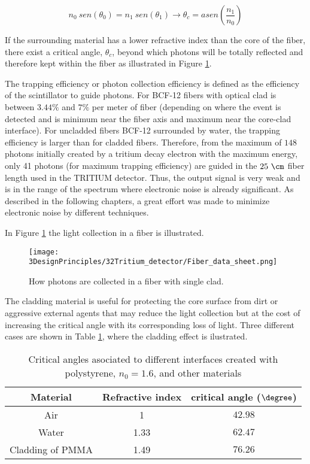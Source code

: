 \begin{equation}
n_0~sen(\theta_0) = n_1~sen(\theta_1) \longrightarrow \theta_c = asen\left(\frac{n_1}{n_0} \right)
\label{eq:Snell}
\end{equation}

If the surrounding material has a lower refractive index than the core of the fiber, there exist a critical angle, $\theta_c$, beyond which photons will be totally reflected and therefore kept within the fiber as illustrated in Figure \ref{fig:Fiber_physic}.

The trapping efficiency or photon collection efficiency is defined as the efficiency of the scintillator to guide photons. For BCF-12 fibers with optical clad is between $3.44\%$ and $7\%$ per meter of fiber (depending on where the event is detected and is minimum near the fiber axis  and maximum near the core-clad interface). For uncladded fibers BCF-12 surrounded by water, the trapping efficiency is larger than for cladded fibers. Therefore, from the maximum of $148$ photons initially created by a tritium decay electron with the maximum energy, only 41 photons (for maximum trapping efficiency) are guided in the $25~\cm$ fiber length used in the TRITIUM detector. Thus, the output signal is very weak and is in the range of the spectrum where electronic noise is already significant. As described in the following chapters, a great effort was made to minimize electronic noise by different techniques.

In Figure \ref{fig:Fiber_physic} the light collection in a fiber is illustrated.

\begin{figure}[htbp]
\centering
\texttt{[image: 3DesignPrinciples/32Tritium\_detector/Fiber\_data\_sheet.png]}
\caption{How photons are collected in a fiber with single clad.\label{fig:Fiber_physic}~\cite{DataSheetBCF12Fiber}}
\end{figure}

The cladding material is useful for protecting the core surface from dirt or aggressive external agents that may reduce the light collection but at the cost of increasing the critical angle with its corresponding loss of light. Three different cases are shown in Table \ref{tab:CriticalAngles}, where the cladding effect is ilustrated.

\begin{table}[htbp]
\begin{center}
\begin{tabular}{|c|c|c|}
\hline
Material & Refractive index & critical angle ($\degree$) \\
\hline \hline \hline
Air & 1 & $42.98$ \\ \hline
Water & 1.33 & $62.47$ \\ \hline
Cladding of PMMA & 1.49 & $76.26$ \\ \hline
\end{tabular}
\caption{Critical angles asociated to different interfaces created with polystyrene, $n_0=1.6$, and other materials}
\label{tab:CriticalAngles}
\end{center}
\end{table}

